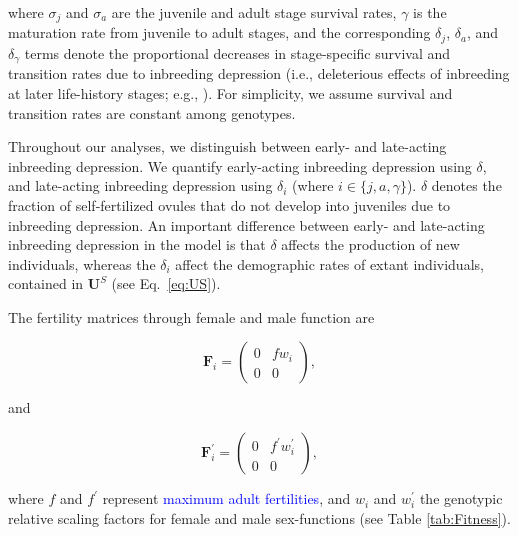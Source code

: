 \documentclass[11pt]{article}
\def\mbf#1{\mathbf{#1}}
\begin{document}
\noindent where $\sigma_j$ and $\sigma_a$ are the juvenile and adult stage survival rates, $\gamma$ is the maturation rate from juvenile to adult stages, and the corresponding $\delta_j$, $\delta_a$, and $\delta_{\gamma}$ terms denote the proportional decreases in stage-specific survival and transition rates due to inbreeding depression (i.e., deleterious effects of inbreeding at later life-history stages; e.g., \citealt{HarderRoutely2006}). For simplicity, we assume survival and transition rates are constant among genotypes. 

Throughout our analyses, we distinguish between early- and late-acting inbreeding depression. We quantify early-acting inbreeding depression using $\delta$, and late-acting inbreeding depression using $\delta_i$ (where $i \in \{j,a,\gamma\}$). $\delta$ denotes the fraction of self-fertilized ovules that do not develop into juveniles due to inbreeding depression. An important difference between early- and late-acting inbreeding depression in the model is that $\delta$ affects the production of new individuals, whereas the $\delta_i$ affect the demographic rates of extant individuals, contained in $\mbf{U}^S$ (see Eq.~\ref{eq:US}).

The fertility matrices through female and male function are
\begin{linenomath*}
\begin{equation}\label{eq:F_female}
	\mbf{F}_{i} = \left(
					\begin{array}{cc}
						0 & f w_{i} \\
						0 & 0
					\end{array}
				\right),
\end{equation}
\end{linenomath*}
\noindent and
\begin{linenomath*}
\begin{equation}\label{eq:F_male}
	\mbf{F}^{\prime}_{i} = \left(
					\begin{array}{cc}
						0 & f^{\prime} w^{\prime}_{i} \\
						0 & 0
					\end{array}
				\right),
\end{equation}
\end{linenomath*}

\noindent where $f$ and $f^{\prime}$ represent \textcolor{blue}{maximum adult fertilities}, and $w_{i}$ and $w^{\prime}_{i}$ the genotypic relative scaling factors for female and male sex-functions (see Table \ref{tab:Fitness}). 
\end{document}

